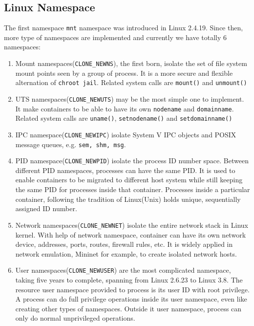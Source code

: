 \documentclass{acm_proc_article-sp}
\begin{document}
\subsection{Linux Namespace}
The first namespace \texttt{mnt} namespace was introduced in Linux 2.4.19. 
Since then, more type of namespaces are implemented and currently we have totally 6 namespaces:
\begin{enumerate}
\item Mount namespaces(\texttt{CLONE\_NEWNS}), the first born, isolate the set of file system mount points seen by a group of process\cite{lwn:namespace:overview}. It is a more secure and flexible alternation of \texttt{chroot jail}. Related system calls are \texttt{mount()} and \texttt{unmount()}

\item UTS namespaces(\texttt{CLONE\_NEWUTS}) may be the most simple one to implement. It make containers to be able to have its own \texttt{nodename} and \texttt{domainname}\cite{lwn:namespace:overview}. Related system calls are \texttt{uname()}, \texttt{setnodename()} and \texttt{setdomainname()} 

\item IPC namespace(\texttt{CLONE\_NEWIPC}) isolate System V IPC objects and POSIX message queues, e.g. \texttt{sem, shm, msg}. 

\item PID namespace(\texttt{CLONE\_NEWPID}) isolate the process ID number space. Between different PID namespaces, processes can have the same PID. 
It is used to enable containers to be migrated to different host system while still keeping the same PID for processes inside that container. 
Processes inside a particular container, following the tradition of Linux(Unix) holds unique, sequentially assigned ID number.\cite{lwn:namespace:pid}

\item Network namespaces(\texttt{CLONE\_NEWNET}) isolate the entire network stack in Linux kernel. With help of network namespace, container can have its own network device, addresses, ports, routes, firewall rules, etc\cite{lwn:namespace:net}. 
It is widely applied in network emulation, Mininet\cite{mininet} for example, to create isolated network hosts.

\item User namespaces(\texttt{CLONE\_NEWUSER}) are the most complicated namespace, taking five years to complete, spanning from Linux 2.6.23 to Linux 3.8\cite{lwn:namespace:user}. 
The resource user namespace provided to process is its user ID with root privilege. 
A process can do full privilege operations inside its user namespace, even like creating other types of namespaces. Outside it user namespace, process can only do normal unprivileged operations.
\end{enumerate}
\end{document}
